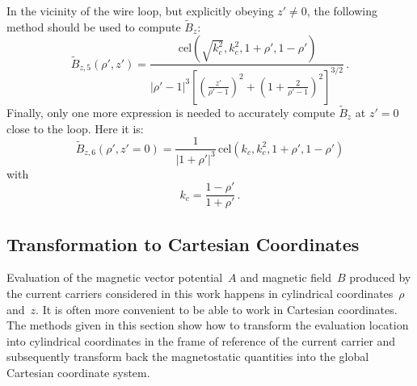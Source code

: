 In the vicinity of the wire loop, but explicitly obeying $z' \neq 0$,
the following method should be used to compute $\tilde{B}_z$:
\begin{equation}
  \tilde{B}_{z,5} (\rho', z')
  = \frac{\,\mathrm{cel}\left( \sqrt{k_c^2}, k_c^2, 1 + \rho', 1 - \rho' \right) }
         {\left|\rho' - 1 \right|^3 \left[ \left( \frac{z'}{\rho'-1} \right)^2 + \left(1 + \frac{2}{\rho'-1} \right)^2 \right]^{3/2} } \, . \label{eqn:cwl_B_z_n}
\end{equation}
Finally, only one more expression is needed to accurately compute $\tilde{B}_z$ at $z'=0$ close to the loop.
Here it is:
\begin{equation}
  \tilde{B}_{z,6} (\rho', z'=0)
  = \frac{1}{|1 + \rho'|^3}
    \,\mathrm{cel}(k_c, k_c^2, 1+\rho', 1-\rho')
\end{equation}
with
\begin{equation}
  k_c = \frac{1-\rho'}{1+\rho'} \, .
\end{equation}
%
%






\subsection{Transformation to Cartesian Coordinates}
Evaluation of the magnetic vector potential~$A$ and magnetic field~$B$
produced by the current carriers considered in this work
happens in cylindrical coordinates~$\rho$ and~$z$.
It is often more convenient to be able to work in Cartesian coordinates.
The methods given in this section show how to transform the evaluation location
into cylindrical coordinates in the frame of reference of the current carrier
and subsequently transform back the magnetostatic quantities into the global Cartesian coordinate system.

